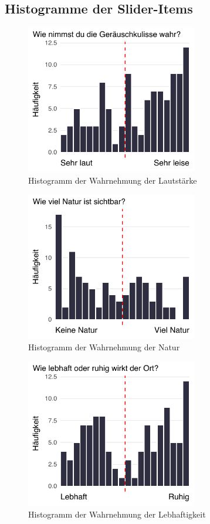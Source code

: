 \begin{appendices}
\subsection*{Histogramme der Slider-Items}
\label{app:slider_hists}

\begin{figure}[ht]
    \centering
    \includegraphics[width=7.5cm]{Analyse/Plots/sliders/environment_noise_hist.pdf}
    \caption{Histogramm der Wahrnehmung der Lautstärke}
    \label{fig:slider_hists_environment_noise}
\end{figure}

\begin{figure}[ht]
    \centering
    \includegraphics[width=7.5cm]{Analyse/Plots/sliders/environment_nature_hist.pdf}
    \caption{Histogramm der Wahrnehmung der Natur}
    \label{fig:slider_hists_environment_nature}
\end{figure}

\begin{figure}[ht]
    \centering
    \includegraphics[width=7.5cm]{Analyse/Plots/sliders/environment_lively_hist.pdf}
    \caption{Histogramm der Wahrnehmung der Lebhaftigkeit}
    \label{fig:slider_hists_environment_lively}
\end{figure}


\end{appendices}
